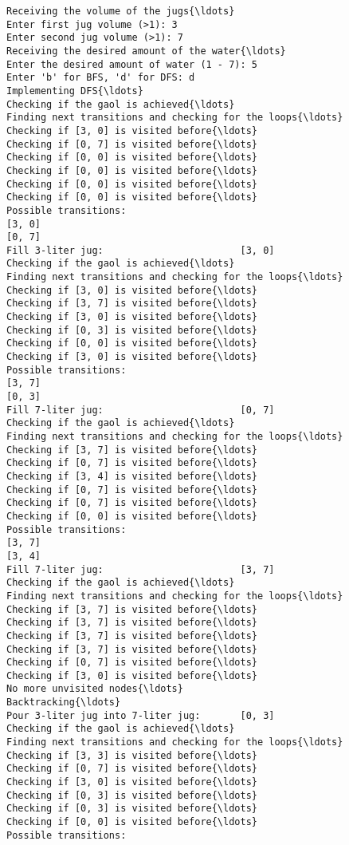 \documentclass[11pt]{article}
\begin{document}
    \begin{Verbatim}[commandchars=\\\{\}]
Receiving the volume of the jugs{\ldots}
Enter first jug volume (>1): 3
Enter second jug volume (>1): 7
Receiving the desired amount of the water{\ldots}
Enter the desired amount of water (1 - 7): 5
Enter 'b' for BFS, 'd' for DFS: d
Implementing DFS{\ldots}
Checking if the gaol is achieved{\ldots}
Finding next transitions and checking for the loops{\ldots}
Checking if [3, 0] is visited before{\ldots}
Checking if [0, 7] is visited before{\ldots}
Checking if [0, 0] is visited before{\ldots}
Checking if [0, 0] is visited before{\ldots}
Checking if [0, 0] is visited before{\ldots}
Checking if [0, 0] is visited before{\ldots}
Possible transitions:
[3, 0]
[0, 7]
Fill 3-liter jug:                        [3, 0]
Checking if the gaol is achieved{\ldots}
Finding next transitions and checking for the loops{\ldots}
Checking if [3, 0] is visited before{\ldots}
Checking if [3, 7] is visited before{\ldots}
Checking if [3, 0] is visited before{\ldots}
Checking if [0, 3] is visited before{\ldots}
Checking if [0, 0] is visited before{\ldots}
Checking if [3, 0] is visited before{\ldots}
Possible transitions:
[3, 7]
[0, 3]
Fill 7-liter jug:                        [0, 7]
Checking if the gaol is achieved{\ldots}
Finding next transitions and checking for the loops{\ldots}
Checking if [3, 7] is visited before{\ldots}
Checking if [0, 7] is visited before{\ldots}
Checking if [3, 4] is visited before{\ldots}
Checking if [0, 7] is visited before{\ldots}
Checking if [0, 7] is visited before{\ldots}
Checking if [0, 0] is visited before{\ldots}
Possible transitions:
[3, 7]
[3, 4]
Fill 7-liter jug:                        [3, 7]
Checking if the gaol is achieved{\ldots}
Finding next transitions and checking for the loops{\ldots}
Checking if [3, 7] is visited before{\ldots}
Checking if [3, 7] is visited before{\ldots}
Checking if [3, 7] is visited before{\ldots}
Checking if [3, 7] is visited before{\ldots}
Checking if [0, 7] is visited before{\ldots}
Checking if [3, 0] is visited before{\ldots}
No more unvisited nodes{\ldots}
Backtracking{\ldots}
Pour 3-liter jug into 7-liter jug:       [0, 3]
Checking if the gaol is achieved{\ldots}
Finding next transitions and checking for the loops{\ldots}
Checking if [3, 3] is visited before{\ldots}
Checking if [0, 7] is visited before{\ldots}
Checking if [3, 0] is visited before{\ldots}
Checking if [0, 3] is visited before{\ldots}
Checking if [0, 3] is visited before{\ldots}
Checking if [0, 0] is visited before{\ldots}
Possible transitions:

\end{Verbatim}
\end{document}
